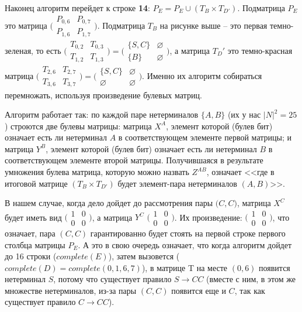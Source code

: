 \documentclass[russian,table]{article}
\begin{document}
Наконец алгоритм перейдет к строке \textbf{14}: $P_E = P_E \cup (T_B \times T_{D'})$. Подматрица $P_E$ это матрица $\bigl(\begin{smallmatrix} P_{0, 6} & P_{0, 7} \\ P_{1, 6} &P_{1, 7} \end{smallmatrix} \bigr)$. Подматрица $T_B$ на рисунке выше -- это первая темно-зеленая, то есть $\bigl(\begin{smallmatrix} T_{0, 2} & T_{0, 3} \\ T_{1, 2} &T_{1, 3} \end{smallmatrix} \bigr) = \bigl(\begin{smallmatrix} \{S, C\} & \varnothing \\ \{B\} & \varnothing \end{smallmatrix} \bigr)$, а матрица $T_D'$ это темно-красная матрица $\bigl(\begin{smallmatrix} T_{2, 6} & T_{2, 7} \\ T_{3, 6} &T_{3, 7} \end{smallmatrix} \bigr)  = \bigl(\begin{smallmatrix} \{S, C\} & \varnothing \\ \varnothing & \varnothing \end{smallmatrix} \bigr)$. Именно их алгоритм собираться перемножать, используя произведение булевых матриц.

Алгоритм работает так: по каждой паре нетерминалов $\{A, B\}$ (их у нас $|N|^2 = 25$) строются две булевы матрицы: матрица $X^A$, элемент которой (булев бит) означает есть ли нетерминал $A$ в соответствующем элементе первой матрицы; и матрица $Y^B$, элемент которой (булев бит) означает есть ли нетерминал $B$ в соответствующем элементе второй матрицы. Получившаяся в результате умножения булева матрица, которую можно назвать $Z^{AB}$, означает <<где в итоговой матрице $(T_B \times T_{D'})$ будет элемент-пара нетерминалов $(A, B)$>>. 

В нашем случае, когда дело дойдет до рассмотрения пары $\mathbf({C, C)}$, матрица $X^C$ будет иметь вид $\bigl(\begin{smallmatrix} 1&0\\0&0 \end{smallmatrix} \bigr)$, а матрица $Y^C$ $\bigl(\begin{smallmatrix} 1&0\\0&0 \end{smallmatrix} \bigr)$. Их произведение: $\bigl(\begin{smallmatrix} 1&0\\0&0 \end{smallmatrix} \bigr)$, что означает, пара $(C, C)$ гарантированно будет стоять на первой строке первого столбца матрицы $P_E$. А это в свою очередь означает, что когда алгоритм дойдет до 16 строки ($complete(E)$), затем вызовется ($complete(D) = complete(0, 1, 6, 7)$), в матрице T на месте $(0, 6)$ появится нетерминал $S$, потому что существует правило $S \to CC$ (вместе с ним, в этом же множестве нетерминалов, из-за пары $(C, C)$ появится еще и $C$, так как существует правило $C \to CC$).
\end{document}
